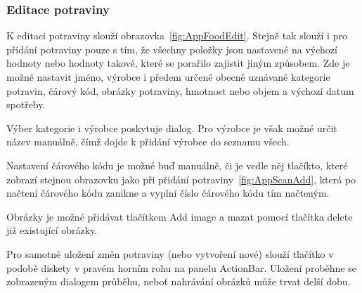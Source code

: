 \documentclass[thesis=B,czech]{FITthesis}[2013/10/20]
\begin{document}
\clearpage

\subsubsection{Editace potraviny}

K editaci potraviny slouží obrazovka~\ref{fig:AppFoodEdit}. Stejně tak slouží i pro přidání potraviny pouze s tím, že všechny položky jsou nastavené na výchozí hodnoty nebo hodnoty takové, které se porařilo zajistit jiným způsobem. Zde je možné nastavit jméno, výrobce i předem určené obecně uznávané kategorie potravin, čárový kód, obrázky potraviny, hmotnost nebo objem a výchozí datum spotřeby.

Výber kategorie i výrobce poskytuje dialog. Pro výrobce je však možné určit název manuálně, čímž dojde k přidání výrobce do seznamu všech.

Nastavení čárového kódu je možné buď manuálně, či je vedle něj tlačíkto, které zobrazí stejnou obrazovku jako při přidání potraviny~\ref{fig:AppScanAdd}, která po načtení čárového kódu zanikne a vyplní číslo čárového kódu tím načteným.

Obrázky je možné přidávat tlačítkem Add image a mazat pomocí tlačítka delete již existující obrázky.

Pro samotné uložení změn potraviny (nebo vytvoření nové) slouží tlačítko v podobě diskety v pravém horním rohu na panelu ActionBar. Uložení proběhne se zobrazeným dialogem průběhu, neboť nahrávání obrázků může trvat delší dobu.
\end{document}
